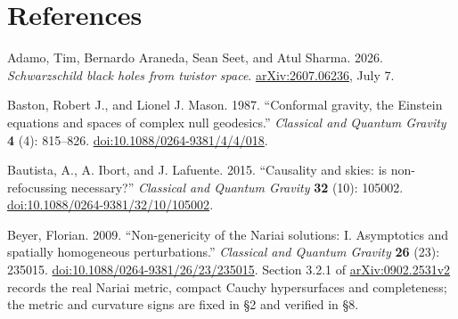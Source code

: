 \documentclass[
  english,
  11pt,
  reqno]{amsart}
\begin{document}
\protect{}\label{sec:references}

\section{References}\label{references}

\begingroup
\makeatletter
\let\@bibtitlestyle\relax
\def\bibliofont{\normalsize}
\renewcommand{\@biblabel}[1]{}
\makeatother
\setlength{\labelsep}{0pt}
\begin{thebibliography}{}
\setlength{\emergencystretch}{5em}
\raggedright


\protect{}\label{ref:AdamoAranedaSeetSharma2026}

Adamo, Tim, Bernardo Araneda, Sean Seet, and Atul Sharma. 2026.
\emph{Schwarzschild black holes from twistor space}.
\href{https://arxiv.org/abs/2607.06236}{arXiv:2607.06236}, July 7.

\protect{}\label{ref:BastonMason1987}

Baston, Robert J., and Lionel J. Mason. 1987. ``Conformal gravity, the
Einstein equations and spaces of complex null geodesics.''
\emph{Classical and Quantum Gravity} \textbf{4} (4): 815--826.
\href{https://doi.org/10.1088/0264-9381/4/4/018}{doi:10.1088/0264-9381/4/4/018}.

\protect{}\label{ref:BautistaIbortLafuente2015}

Bautista, A., A. Ibort, and J. Lafuente. 2015. ``Causality and skies: is
non-refocussing necessary?'' \emph{Classical and Quantum Gravity}
\textbf{32} (10): 105002.
\href{https://doi.org/10.1088/0264-9381/32/10/105002}{doi:10.1088/0264-9381/32/10/105002}.

\protect{}\label{ref:Beyer2009}

Beyer, Florian. 2009. ``Non-genericity of the Nariai solutions: I.
Asymptotics and spatially homogeneous perturbations.'' \emph{Classical
and Quantum Gravity} \textbf{26} (23): 235015.
\href{https://doi.org/10.1088/0264-9381/26/23/235015}{doi:10.1088/0264-9381/26/23/235015}.
Section 3.2.1 of
\href{https://arxiv.org/abs/0902.2531v2}{arXiv:0902.2531v2} records the
real Nariai metric, compact Cauchy hypersurfaces and completeness; the
metric and curvature signs are fixed in §2 and verified in §8.

\protect{}\label{ref:Chernov2018}


\end{thebibliography}
\end{document}
